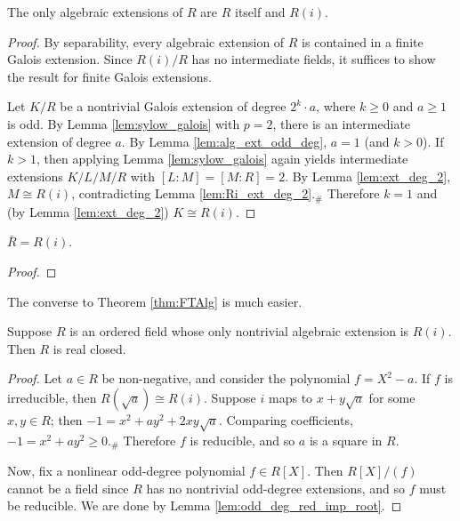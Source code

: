 \begin{theorem}
  \label{thm:FTAlg}
  The only algebraic extensions of $R$ are $R$ itself and $R(i)$.
\end{theorem}
\begin{proof}
  By separability, every algebraic extension of $R$ is contained in a finite Galois extension. Since $R(i)/R$ has no intermediate fields, it suffices to show the result for finite Galois extensions.
  
  Let $K/R$ be a nontrivial Galois extension of degree $2^k\cdot a$, where $k\geq 0$ and $a\geq1$ is odd. By Lemma \ref{lem:sylow_galois} with $p=2$, there is an intermediate extension of degree $a$. By Lemma \ref{lem:alg_ext_odd_deg}, $a=1$ (and $k>0$). If $k>1$, then applying Lemma \ref{lem:sylow_galois} again yields intermediate extensions $K/L/M/R$ with $[L:M]=[M:R]=2$. By Lemma \ref{lem:ext_deg_2}, $M\cong R(i)$, contradicting Lemma \ref{lem:Ri_ext_deg_2}.$_\#$ Therefore $k=1$ and (by Lemma \ref{lem:ext_deg_2}) $K\cong R(i)$.
\end{proof}

\begin{corollary}
  \label{cor:RCF_ac}
  $\bar{R}=R(i)$.
\end{corollary}
\begin{proof}
\end{proof}

The converse to Theorem \ref{thm:FTAlg} is much easier.

\begin{lemma}
  \label{lem:FTAlg_converse}
  Suppose $R$ is an ordered field whose only nontrivial algebraic extension is $R(i)$. Then $R$ is real closed.
\end{lemma}
\begin{proof}
  Let $a\in R$ be non-negative, and consider the polynomial $f=X^2-a$. If $f$ is irreducible, then $R(\sqrt{a})\cong R(i)$. Suppose $i$ maps to $x+y\sqrt{a}$ for some $x,y\in R$; then $-1=x^2+ay^2+2xy\sqrt{a}$. Comparing coefficients, $-1=x^2+ay^2\geq0$.$_\#$ Therefore $f$ is reducible, and so $a$ is a square in $R$.

  Now, fix a nonlinear odd-degree polynomial $f\in R[X]$. Then $R[X]/(f)$ cannot be a field since $R$ has no nontrivial odd-degree extensions, and so $f$ must be reducible. We are done by Lemma \ref{lem:odd_deg_red_imp_root}.
\end{proof}

